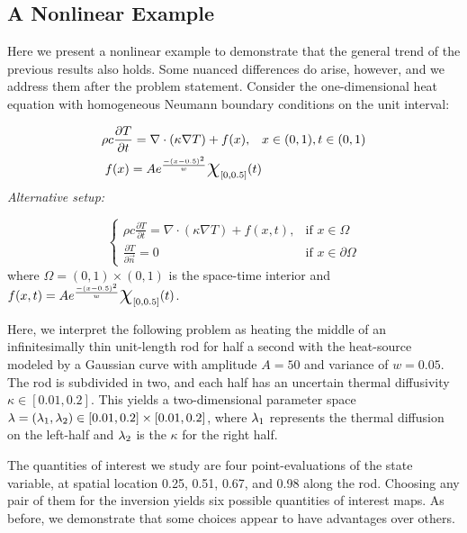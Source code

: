 \subsection{A Nonlinear Example}\label{sec:nonlinear}
Here we present a nonlinear example to demonstrate that the general trend of the previous results also holds. 
Some nuanced differences do arise, however, and we address them after the problem statement.
Consider the one-dimensional heat equation with homogeneous Neumann boundary conditions on the unit interval:

\begin{equation}
\begin{split}
\rho c \frac{\partial T}{\partial t} = \nabla \cdot ( \kappa \nabla T) + f(x), \quad & x\in (0,1), t\in (0,1) \\
f(x) = A e^\frac{- (x-0.5)^2}{w} \Chi_{[0,0.5]}(t) 
\end{split}
\end{equation}
\emph{Alternative setup: }

\begin{equation}
\begin{cases}
\rho c \frac{\partial T}{\partial t} = \nabla \cdot ( \kappa \nabla T) + f(x,t), & \text{if } x\in \Omega \\
\frac{\partial T}{\partial \vec{n}} = 0 & \text{if } x\in \partial \Omega
\end{cases}
\end{equation}
where $\Omega = (0,1)\times (0,1)$ is the space-time interior and $f(x,t) = A e^\frac{- (x-0.5)^2}{w} \Chi_{[0,0.5]}(t)$. 

Here, we interpret the following problem as heating the middle of an infinitesimally thin unit-length rod for half a second with the heat-source modeled by a Gaussian curve with amplitude $A=50$ and variance of $w=0.05$. 
The rod is subdivided in two, and each half has an uncertain thermal diffusivity $\kappa \in [0.01, 0.2]$.
This yields a two-dimensional parameter space $\lambda = (\lambda_1, \lambda_2) \in [0.01, 0.2]\times [0.01, 0.2]$, where $\lambda_1$ represents the thermal diffusion on the left-half and $\lambda_2$ is the $\kappa$ for the right half.

The quantities of interest we study are four point-evaluations of the state variable, at spatial location 0.25, 0.51, 0.67, and 0.98 along the rod.
Choosing any pair of them for the inversion yields six possible quantities of interest maps. 
As before, we demonstrate that some choices appear to have advantages over others. 

